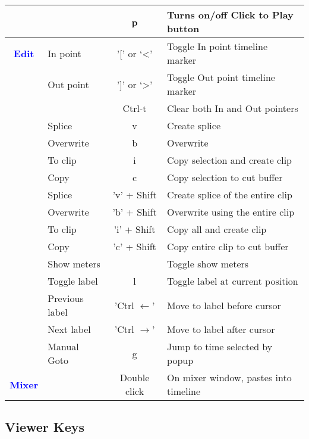 \begin{center}
\begin{longtable}{ >{\bfseries}c l c p{6cm}}
        &  & p & Turns on/off Click to Play button \\
        \midrule
        \textcolor{blue}{Edit} & In point & '[' or ‘<’ & Toggle In point timeline marker\\        
        & Out point & ']' or ‘>’ & Toggle Out point timeline marker \\        
        &  & Ctrl-t & Clear both In and Out pointers \\        
        & Splice & v & Create splice \\        
        & Overwrite & b & Overwrite \\        
        & To clip & i & Copy selection and create clip \\        
        & Copy & c & Copy selection to cut buffer \\        
        & Splice & 'v' + Shift & Create splice of the entire clip \\        
        & Overwrite & 'b' + Shift & Overwrite using the entire clip \\        
        & To clip & 'i' + Shift & Copy all and create clip \\        
        & Copy & 'c' + Shift & Copy entire clip to cut buffer \\        
        & Show meters &  & Toggle show meters \\        
        & Toggle label & l & Toggle label at current position \\        
        & Previous label & 'Ctrl $\leftarrow$' & Move to label before cursor \\        
        & Next label & 'Ctrl $\rightarrow$' & Move to label after cursor \\        
        & Manual Goto & g & Jump to time selected by popup \\
        \midrule
        \textcolor{blue}{Mixer} &  & Double click & On mixer window, pastes into timeline\\        
        
        \bottomrule  
    \end{longtable}
\end{center}      

\subsection{Viewer Keys }%
\label{ssec:viewer_keys}

